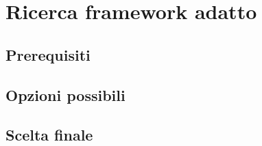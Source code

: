 \chapter{Ricerca framework adatto}
\label{sec:ricerca_framework}

\section{Prerequisiti}
\label{sec:prerequisiti}

\lipsum[1]

\section{Opzioni possibili}
\label{sec:opzioni_possibili}

\lipsum[1]

\section{Scelta finale}
\label{sec:scelta_finale}

\lipsum[1]